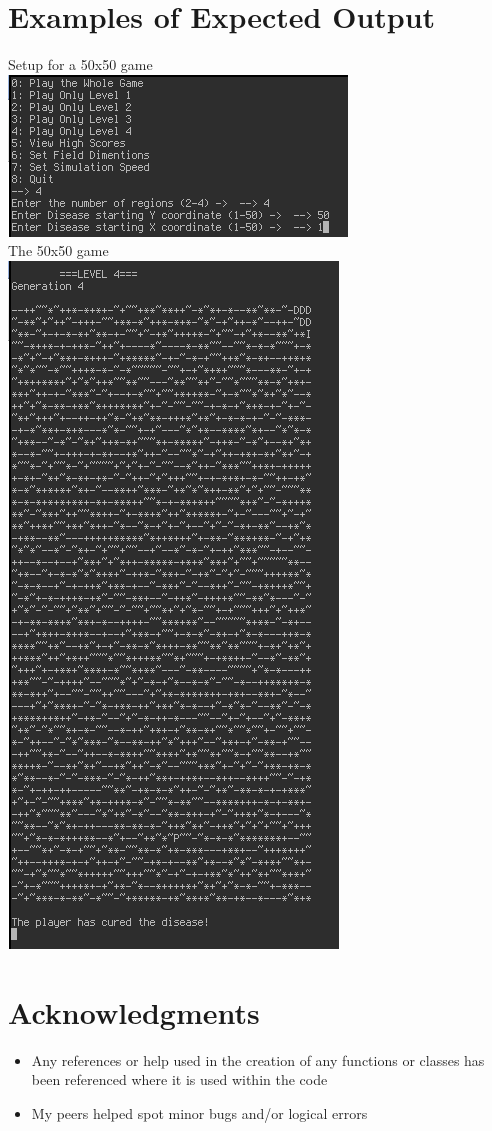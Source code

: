 \documentclass[pdftex,12pt,a4paper]{article}
\begin{document}
	\section{Examples of Expected Output}
		Setup for a 50x50 game\\
		\includegraphics{./fig7.png}\\
		The 50x50 game\\
		\includegraphics{./fig8.png}
	\section{Acknowledgments}
		\begin{itemize}
			\item Any references or help used in the creation of any functions or classes has been referenced where it is used within the code
			\item My peers helped spot minor bugs and/or logical errors
		\end{itemize}
\end{document}
